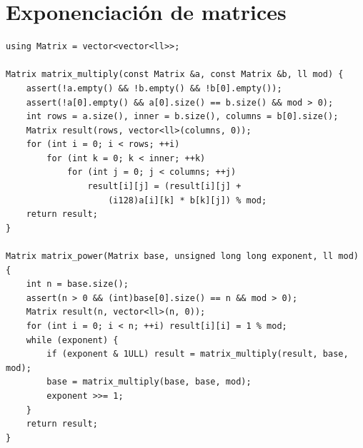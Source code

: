 \section{Exponenciaci\'on de matrices}

\begin{lstlisting}[style=cpp]
using Matrix = vector<vector<ll>>;

Matrix matrix_multiply(const Matrix &a, const Matrix &b, ll mod) {
    assert(!a.empty() && !b.empty() && !b[0].empty());
    assert(!a[0].empty() && a[0].size() == b.size() && mod > 0);
    int rows = a.size(), inner = b.size(), columns = b[0].size();
    Matrix result(rows, vector<ll>(columns, 0));
    for (int i = 0; i < rows; ++i)
        for (int k = 0; k < inner; ++k)
            for (int j = 0; j < columns; ++j)
                result[i][j] = (result[i][j] +
                    (i128)a[i][k] * b[k][j]) % mod;
    return result;
}

Matrix matrix_power(Matrix base, unsigned long long exponent, ll mod) {
    int n = base.size();
    assert(n > 0 && (int)base[0].size() == n && mod > 0);
    Matrix result(n, vector<ll>(n, 0));
    for (int i = 0; i < n; ++i) result[i][i] = 1 % mod;
    while (exponent) {
        if (exponent & 1ULL) result = matrix_multiply(result, base, mod);
        base = matrix_multiply(base, base, mod);
        exponent >>= 1;
    }
    return result;
}
\end{lstlisting}

